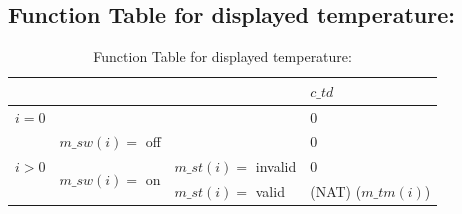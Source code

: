 \documentclass[fontsize=12pt,paper=letter,twoside]{scrartcl}
\begin{document}
\subsection{Function Table for displayed temperature: }
\begin{table}[htb!]
\centering
\label{my-label}
\begin{tabular}{lll|l|}
\cline{4-4}
                                                        &                                                     &                    & $c\_td$            \\ \hline
\multicolumn{3}{|l|}{$i = 0$}                                                                                                        & 0                \\ \hline
\multicolumn{1}{|l|}{\multirow{3}{*}{$i > 0$}} & \multicolumn{2}{l|}{$m\_sw(i) =$ off}                                      & 0                \\ \cline{2-4}
\multicolumn{1}{|l|}{}                                  & \multicolumn{1}{l|}{\multirow{2}{*}{$m\_sw(i) =$ on}} & $m\_st(i) =$ invalid & 0                \\ \cline{3-4}
\multicolumn{1}{|l|}{}                                  & \multicolumn{1}{l|}{}                               & $m\_st(i) =$ valid   & (NAT) ($m\_tm(i)$) \\ \hline
\end{tabular}
\caption{Function Table for displayed temperature: }
\end{table}
\end{document}
